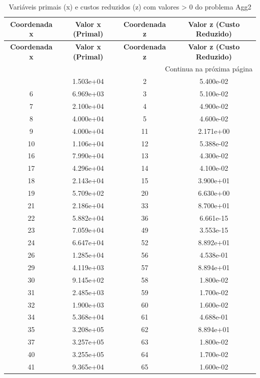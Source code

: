 \documentclass[12pt]{article}
\begin{document}
\begin{longtable}{@{}cccc@{}}
\caption{Variáveis primais (x) e custos reduzidos (z) com valores > 0 do problema Agg2} \\
\toprule
\textbf{Coordenada x} & \textbf{Valor x (Primal)} & \textbf{Coordenada z} & \textbf{Valor z (Custo Reduzido)} \\
\midrule
\endfirsthead

\toprule
\textbf{Coordenada x} & \textbf{Valor x (Primal)} & \textbf{Coordenada z} & \textbf{Valor z (Custo Reduzido)} \\
\midrule
\endhead

\midrule \multicolumn{4}{r}{{Continua na próxima página}} \\ \midrule
\endfoot

\bottomrule
\endlastfoot
1 & 1.503e+04 & 2 & 5.400e-02 \\
6 & 6.969e+03 & 3 & 5.100e-02 \\
7 & 2.100e+04 & 4 & 4.900e-02 \\
8 & 4.000e+04 & 5 & 4.600e-02 \\
9 & 4.000e+04 & 11 & 2.171e+00 \\
10 & 1.106e+04 & 12 & 5.388e-02 \\
16 & 7.990e+04 & 13 & 4.300e-02 \\
17 & 4.296e+04 & 14 & 4.100e-02 \\
18 & 2.143e+04 & 15 & 3.900e+01 \\
19 & 5.709e+02 & 20 & 6.630e+00 \\
21 & 2.186e+04 & 33 & 8.700e+01 \\
22 & 5.882e+04 & 36 & 6.661e-15 \\
23 & 7.059e+04 & 49 & 3.553e-15 \\
24 & 6.647e+04 & 52 & 8.892e+01 \\
26 & 1.285e+04 & 56 & 4.538e-01 \\
29 & 4.119e+03 & 57 & 8.894e+01 \\
30 & 9.145e+02 & 58 & 1.800e-02 \\
31 & 2.485e+03 & 59 & 1.700e-02 \\
32 & 1.900e+03 & 60 & 1.600e-02 \\
34 & 5.368e+04 & 61 & 4.688e-01 \\
35 & 3.208e+05 & 62 & 8.894e+01 \\
37 & 3.257e+05 & 63 & 1.800e-02 \\
40 & 3.255e+05 & 64 & 1.700e-02 \\
41 & 9.365e+04 & 65 & 1.600e-02 \\

\end{longtable}
\end{document}
